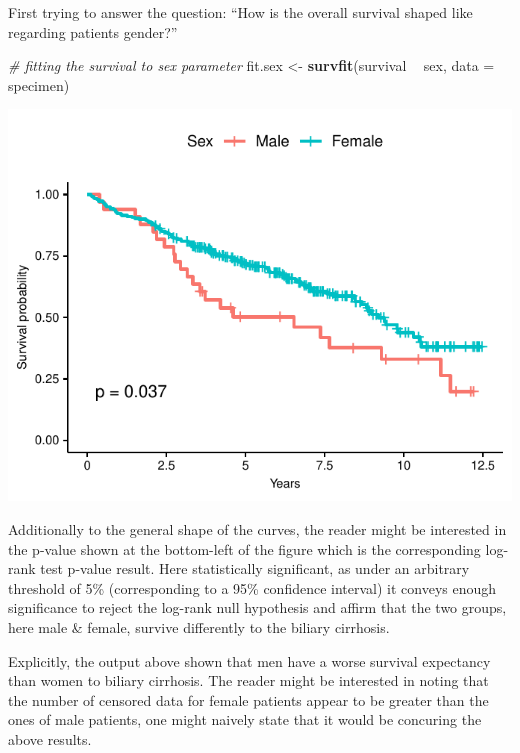 \documentclass[]{article}
\newenvironment{Shaded}{\begin{snugshade}}{\end{snugshade}}
\newcommand{\KeywordTok}[1]{\textcolor[rgb]{0.13,0.29,0.53}{\textbf{#1}}}
\newcommand{\DataTypeTok}[1]{\textcolor[rgb]{0.13,0.29,0.53}{#1}}
\newcommand{\StringTok}[1]{\textcolor[rgb]{0.31,0.60,0.02}{#1}}
\newcommand{\CommentTok}[1]{\textcolor[rgb]{0.56,0.35,0.01}{\textit{#1}}}
\newcommand{\OperatorTok}[1]{\textcolor[rgb]{0.81,0.36,0.00}{\textbf{#1}}}
\newcommand{\NormalTok}[1]{#1}
\begin{document}
First trying to answer the question: ``How is the overall survival
shaped like regarding patients gender?''

\begin{Shaded}
\begin{Highlighting}[]
\CommentTok{# fitting the survival to sex parameter}
\NormalTok{fit.sex <-}\StringTok{ }\KeywordTok{survfit}\NormalTok{(survival }\OperatorTok{~}\StringTok{ }\NormalTok{sex, }\DataTypeTok{data =}\NormalTok{ specimen)}
\end{Highlighting}
\end{Shaded}

\includegraphics{survival_pbc_files/figure-latex/unnamed-chunk-15-1.pdf}

Additionally to the general shape of the curves, the reader might be
interested in the p-value shown at the bottom-left of the figure which
is the corresponding log-rank test p-value result. Here statistically
significant, as under an arbitrary threshold of 5\% (corresponding to a
95\% confidence interval) it conveys enough significance to reject the
log-rank null hypothesis and affirm that the two groups, here male \&
female, survive differently to the biliary cirrhosis.

Explicitly, the output above shown that men have a worse survival
expectancy than women to biliary cirrhosis. The reader might be
interested in noting that the number of censored data for female
patients appear to be greater than the ones of male patients, one might
naively state that it would be concuring the above results.
\end{document}
